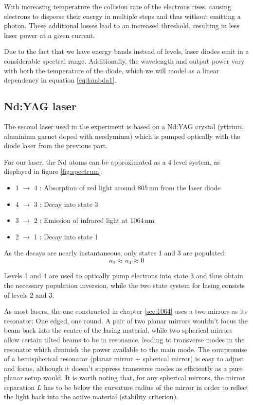 With increasing temperature the collision rate of the electrons rises, causing electrons to disperse their energy in multiple steps and thus without emitting a photon. These additional losses lead to an increased threshold, resulting in less laser power at a given current.

Due to the fact that we have energy bands instead of levels, laser diodes emit in a considerable spectral range. Additionally, the wavelength and output power vary with both the temperature of the diode, which we will model as a linear dependency in equation \eqref{eq:lambda1}. 


\subsection{Nd:YAG laser}
The second laser used in the experiment is based on a Nd:YAG crystal (yttrium aluminium garnet doped with neodymium) which is pumped optically with the diode laser from the previous part.

For our laser, the \textsf{Nd} atoms can be approximated as a 4 level system, as displayed in figure \ref{fig:spectrum}:
\begin{itemize}
\item 1 $\rightarrow$ 4 : Absorption of red light around 805\,nm from the laser diode
\item 4 $\rightarrow$ 3 : Decay into state 3
\item 3 $\rightarrow$ 2 : Emission of infrared light at 1064\,nm
\item 2 $\rightarrow$ 1 : Decay into state 1
\end{itemize}


As the decays are nearly instantaneous, only states 1 and 3 are populated:
\begin{equation}
n_2 \approx n_4 \approx 0
\end{equation}

Levels 1 and 4 are used to optically pump electrons into state 3 and thus obtain the necessary population inversion, while the two state system for lasing consists of levels 2 and 3.

As most lasers, the one constructed in chapter \ref{sec:1064} uses a two mirrors as its resonator: One edged, one round. A pair of two planar mirrors wouldn't focus the beam back into the centre of the lasing material, while two spherical mirrors allow certain tilted beams to be in resonance, leading to transverse modes in the resonator which diminish the power available to the main mode. The compromise of a hemispherical resonator (planar mirror + spherical mirror) is easy to adjust and focus, although it doesn't suppress transverse modes as efficiently as a pure planar setup would. It is worth noting that, for any spherical mirrors, the mirror separation $L$ has to be below the curvature radius of the mirror in order to reflect the light back into the active material (stability criterion).

